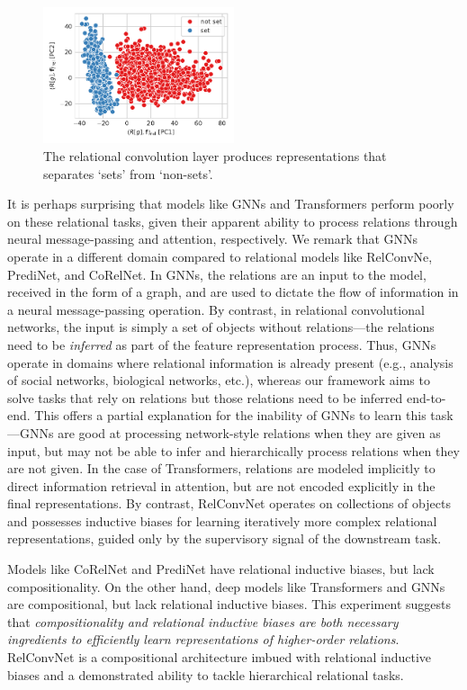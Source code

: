 \begin{figure}
    \centering
    \includegraphics[width=0.5\textwidth]{figs/representation_analysis/conv_rep.pdf}
    \caption{The relational convolution layer produces representations that separates `sets' from `non-sets'.}\label{fig:conv_rep}
\end{figure}

It is perhaps surprising that models like GNNs and Transformers perform poorly on these relational tasks, given their apparent ability to process relations through neural message-passing and attention, respectively. We remark that GNNs operate in a different domain compared to relational models like RelConvNe, PrediNet, and CoRelNet. In GNNs, the relations are an input to the model, received in the form of a graph, and are used to dictate the flow of information in a neural message-passing operation. By contrast, in relational convolutional networks, the input is simply a set of objects without relations---the relations need to be \textit{inferred} as part of the feature representation process. 
Thus, GNNs operate in domains where relational information is already present (e.g., analysis of social networks, biological networks, etc.), whereas our framework aims to solve tasks that rely on relations but those relations need to be inferred end-to-end. 
This offers a partial explanation for the inability of GNNs to learn this task---GNNs are good at processing network-style relations when they are given as input, but may not be able to infer and hierarchically process relations when they are not given. In the case of Transformers, relations are modeled implicitly to direct information retrieval in attention, but are not encoded explicitly in the final representations. By contrast, RelConvNet operates on collections of objects and possesses inductive biases for learning iteratively more complex relational representations, guided only by the supervisory signal of the downstream task. 

Models like CoRelNet and PrediNet have relational inductive biases, but lack compositionality. On the other hand, deep models like Transformers and GNNs are compositional, but lack relational inductive biases. This experiment suggests that \textit{compositionality and relational inductive biases are both necessary ingredients to efficiently learn representations of higher-order relations}. RelConvNet is a compositional architecture imbued with relational inductive biases and a demonstrated ability to tackle hierarchical relational tasks.
